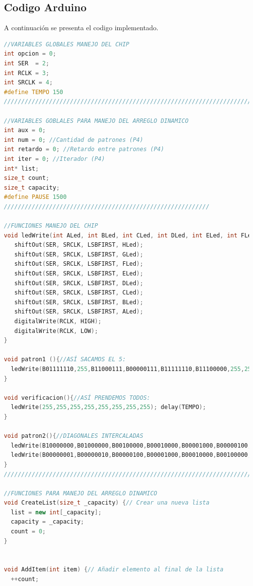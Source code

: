 \documentclass{article}
\begin{document}
\subsection{Codigo Arduino}
%
A continuación se presenta el codigo implementado.

\begin{lstlisting}[language=C++, label=codigo_ejemplo]
//VARIABLES GLOBALES MANEJO DEL CHIP
int opcion = 0;
int SER  = 2;
int RCLK = 3;
int SRCLK = 4;
#define TEMPO 150
/////////////////////////////////////////////////////////////////////////////////////////

//VARIABLES GOBLALES PARA MANEJO DEL ARREGLO DINAMICO
int aux = 0;
int num = 0; //Cantidad de patrones (P4)
int retardo = 0; //Retardo entre patrones (P4)
int iter = 0; //Iterador (P4)
int* list;
size_t count;
size_t capacity;
#define PAUSE 1500
///////////////////////////////////////////////////////////

//FUNCIONES MANEJO DEL CHIP
void ledWrite(int ALed, int BLed, int CLed, int DLed, int ELed, int FLed, int GLed, int HLed){//Funcion para escribir en la matriz
   shiftOut(SER, SRCLK, LSBFIRST, HLed);
   shiftOut(SER, SRCLK, LSBFIRST, GLed);
   shiftOut(SER, SRCLK, LSBFIRST, FLed);
   shiftOut(SER, SRCLK, LSBFIRST, ELed);
   shiftOut(SER, SRCLK, LSBFIRST, DLed);
   shiftOut(SER, SRCLK, LSBFIRST, CLed);
   shiftOut(SER, SRCLK, LSBFIRST, BLed);
   shiftOut(SER, SRCLK, LSBFIRST, ALed);
   digitalWrite(RCLK, HIGH);
   digitalWrite(RCLK, LOW);
}

void patron1 (){//ASÍ SACAMOS EL 5:
  ledWrite(B01111110,255,B11000111,B00000111,B11111110,B11100000,255,255); delay(TEMPO); 
}

void verificacion(){//ASÍ PRENDEMOS TODOS:
  ledWrite(255,255,255,255,255,255,255,255); delay(TEMPO);  
}

void patron2(){//DIAGONALES INTERCALADAS
  ledWrite(B10000000,B01000000,B00100000,B00010000,B00001000,B00000100,B00000010,B00000001); delay(TEMPO);
  ledWrite(B00000001,B00000010,B00000100,B00001000,B00010000,B00100000,B01000000,B10000000); delay(TEMPO);
}
/////////////////////////////////////////////////////////////////////////////////////////////////////////

//FUNCIONES PARA MANEJO DEL ARREGLO DINAMICO
void CreateList(size_t _capacity) {// Crear una nueva lista
  list = new int[_capacity];
  capacity = _capacity;
  count = 0;
}


void AddItem(int item) {// Añadir elemento al final de la lista
  ++count;
    

\end{lstlisting}
\end{document}
